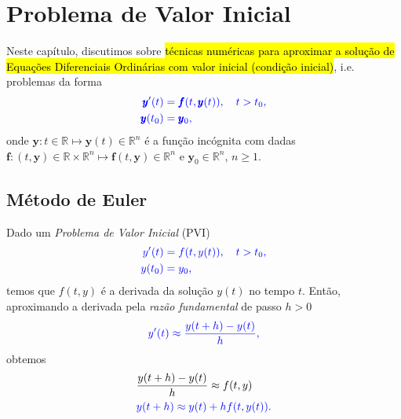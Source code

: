 
\chapter{Problema de Valor Inicial}\label{cap_pvi}
\thispagestyle{fancy}

Neste capítulo, discutimos sobre \hl{técnicas numéricas para aproximar a solução de Equações Diferenciais Ordinárias com valor inicial (condição inicial)}, i.e. problemas da forma
\begin{subequations}\hleq
  \begin{align}
    \pmb{y}'(t) &= \pmb{f}(t,\pmb{y}(t)),\quad t>t_0,\\
    \pmb{y}(t_0) &= \pmb{y}_0,
  \end{align}
\end{subequations}
onde $\pmb{y}:t\in\mathbb{R}\mapsto\pmb{y}(t)\in\mathbb{R}^n$ é a função incógnita com dadas $\pmb{f}:(t,\pmb{y})\in\mathbb{R}\times\mathbb{R}^n\mapsto\pmb{f}(t,\pmb{y})\in\mathbb{R}^n$ e $\pmb{y}_0\in\mathbb{R}^n$, $n\geq 1$.

\section{Método de Euler}\label{cap_pvi_sec_euler}

Dado um \emph{Problema de Valor Inicial} (PVI)
\begin{subequations}\label{cap_pvi_sec_euler:eq:pvi}\hleq
  \begin{align}
    y'(t) &= f(t,y(t)),\quad t>t_0,\\
    y(t_0) &= y_0,
  \end{align}
\end{subequations}
temos que $f(t,y)$ é a derivada da solução $y(t)$ no tempo $t$. Então, aproximando a derivada pela \emph{razão fundamental} de passo $h>0$
\begin{equation}\color{blue}y'(t) \approx \frac{y(t+h)-y(t)}{h},
\end{equation}
obtemos
\begin{align}
  &\frac{y(t+h)-y(t)}{h} \approx f(t,y) \\
  &\color{blue}y(t+h) \approx y(t) + hf(t,y(t)).\label{cap_pvi_sec_euler:eq:euler_aux1}
\end{align}

